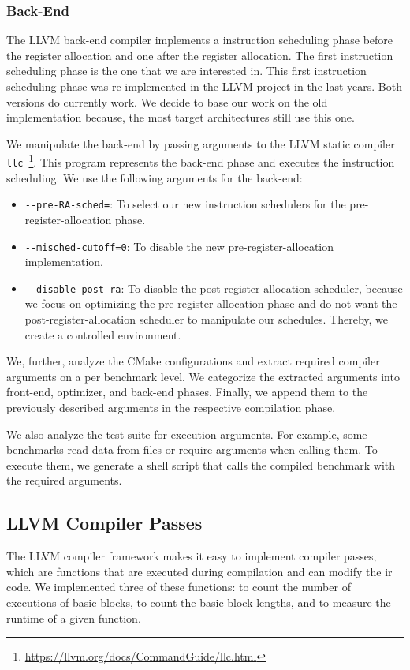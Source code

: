 \subsubsection{Back-End}
The LLVM back-end compiler implements a instruction scheduling phase before the register allocation and one after the register allocation.
The first instruction scheduling phase is the one that we are interested in.
This first instruction scheduling phase was re-implemented in the LLVM project in the last years.
Both versions do currently work.
We decide to base our work on the old implementation because, the most target architectures still use this one.

We manipulate the back-end by passing arguments to the LLVM static compiler \lstinline{llc}~\footnote{\url{https://llvm.org/docs/CommandGuide/llc.html}}.
This program represents the back-end phase and executes the instruction scheduling.
We use the following arguments for the back-end:
\begin{itemize}
    \item \lstinline{--pre-RA-sched=}: To select our new instruction schedulers for the pre-register-allocation phase.
    \item \lstinline{--misched-cutoff=0}: To disable the new pre-register-allocation implementation.
    \item \lstinline{--disable-post-ra}: To disable the post-register-allocation scheduler, because we focus on optimizing the pre-register-allocation phase and do not want the post-register-allocation scheduler to manipulate our schedules. Thereby, we create a controlled environment.
\end{itemize}

We, further, analyze the CMake configurations and extract required compiler arguments on a per benchmark level.
We categorize the extracted arguments into front-end, optimizer, and back-end phases.
Finally, we append them to the previously described arguments in the respective compilation phase.

We also analyze the test suite for execution arguments.
For example, some benchmarks read data from files or require arguments when calling them.
To execute them, we generate a shell script that calls the compiled benchmark with the required arguments.

\subsection{LLVM Compiler Passes}
\label{sec:approach:llvm-passes}
The LLVM compiler framework makes it easy to implement compiler passes, which are functions that are executed during compilation and can modify the \ac{ir} code.
We implemented three of these functions: to count the number of executions of basic blocks, to count the basic block lengths, and to measure the runtime of a given function.

